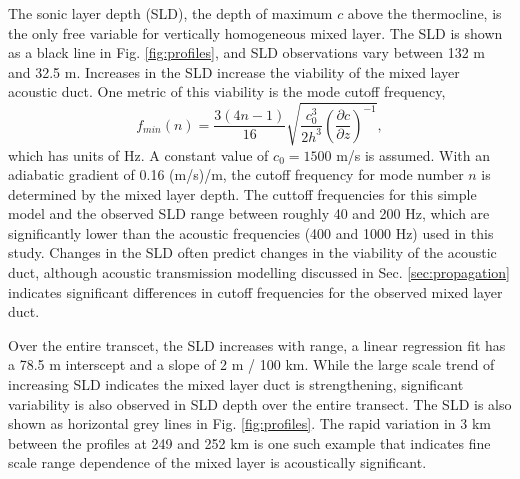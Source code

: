 \documentclass[preprint,NumberedRefs]{JASA}
\begin{document}
The sonic layer depth (SLD), the depth of maximum $c$ above the thermocline, is the only free variable for vertically homogeneous mixed layer. The SLD is shown as a black line in Fig. \ref{fig:profiles}, and SLD observations vary between 132 m and 32.5 m. Increases in the SLD increase the viability of the mixed layer acoustic duct. One metric of this viability is the mode cutoff frequency,
\begin{equation}
    f_{min}(n) = \frac{3(4n-1)}{16} \sqrt{\frac{c_0^3}{2h^3} \left( \frac{\partial c}{\partial z} \right) ^ {-1}},
    \label{eq:f_cutoff}
\end{equation}
which has units of Hz. A constant value of $c_0 = 1500$ m/s is assumed. With an adiabatic gradient of 0.16 (m/s)/m, the cutoff frequency for mode number $n$ is determined by the mixed layer depth. The cuttoff frequencies for this simple model and the observed SLD range between roughly 40 and 200 Hz, which are significantly lower than the acoustic frequencies (400 and 1000 Hz) used in this study. Changes in the SLD often predict changes in the viability of the acoustic duct, although acoustic transmission modelling discussed in Sec. \ref{sec:propagation} indicates significant differences in cutoff frequencies for the observed mixed layer duct.

Over the entire transcet, the SLD increases with range, a linear regression fit has a 78.5 m interscept and a slope of 2 m / 100 km. While the large scale trend of increasing SLD indicates the mixed layer duct is strengthening, significant variability is also observed in SLD depth over the entire transect. The SLD is also shown as horizontal grey lines in Fig. \ref{fig:profiles}. The rapid variation in 3 km between the profiles at 249 and 252 km is one such example that indicates fine scale range dependence of the mixed layer is acoustically significant.
\end{document}
